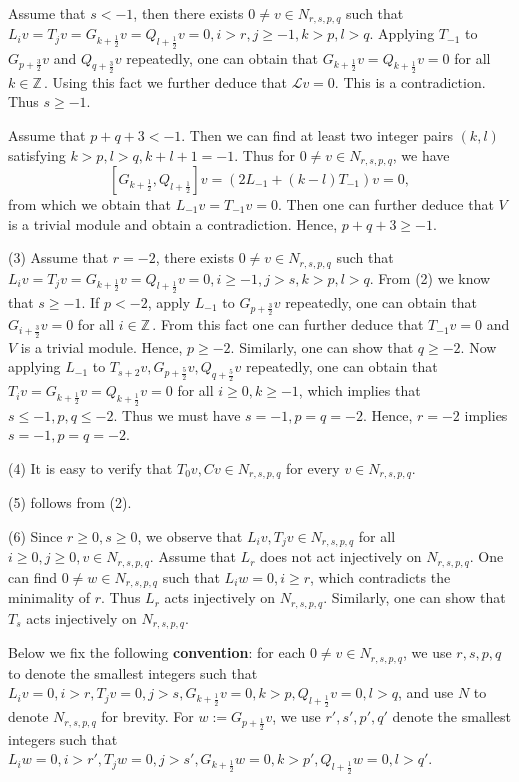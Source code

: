 \documentclass[12pt]{article}
\def\ssc{\scriptscriptstyle}
\def\Z{\mathbb{Z}{\ssc\,}}
\numberwithin{equation}{section}
\begin{document}
Assume that $s<-1$, then there exists $0\ne v\in N_{r,s,p,q}$ such that $L_iv=T_jv=G_{k+\frac{1}{2}}v=Q_{l+\frac{1}{2}}v=0, i>r,j\ge -1,k>p,l>q$. Applying $T_{-1}$ to $G_{p+\frac{3}{2}}v$ and $Q_{q+\frac{3}{2}}v$ repeatedly,
one can obtain that $G_{k+\frac{1}{2}}v=Q_{k+\frac{1}{2}}v=0$ for all $k\in\Z$. Using this fact we  further deduce  that $\mathcal{L}v=0$. This is a contradiction. Thus $s\ge -1$.

Assume that $p+q+3<-1$.  Then we can find at least two integer pairs $(k,l)$  satisfying $k>p,l>q, k+l+1=-1$. Thus for $0\ne v\in N_{r,s,p,q}$, we have
$$[G_{k+\frac{1}{2}},Q_{l+\frac{1}{2}}]v=(2L_{-1}+(k-l)T_{-1})v=0,$$
from which we obtain that
$L_{-1}v=T_{-1}v=0.$ Then one can further deduce that $V$ is a trivial module and obtain a contradiction. Hence, $p+q+3\ge -1.$

(3) Assume that $r=-2$, there exists $0\ne v\in N_{r,s,p,q}$ such that $L_iv=T_jv=G_{k+\frac{1}{2}}v=Q_{l+\frac{1}{2}}v=0, i\ge -1,j>s,k>p,l>q$. From (2) we know that $s\ge -1$. If $p<-2$, apply $L_{-1}$ to $G_{p+\frac{3}{2}}v$ repeatedly, one can obtain that $G_{i+\frac{3}{2}}v=0$ for all $i\in\Z$. From this fact one can further deduce that $T_{-1}v=0$ and $V$ is a trivial module. Hence, $p\ge -2$. Similarly, one can show that $q\ge -2$. Now applying $L_{-1}$ to $T_{s+2}v,G_{p+\frac{5}{2}}v,Q_{q+\frac{5}{2}}v$ repeatedly,
one can obtain that $T_iv=G_{k+\frac{1}{2}}v=Q_{k+\frac{1}{2}}v=0$ for all $i\ge 0, k\ge -1$, which implies that $s\le -1,p,q\le -2$. Thus we must have $s=-1,p=q=-2$. Hence,  $r=-2$ implies  $s=-1,p=q=-2$.

(4) It is easy to verify that $T_0 v, C v\in N_{r,s,p,q}$ for every $v\in N_{r,s,p,q}$.

(5) follows from (2).

 (6) Since $r\ge 0, s\ge 0$, we observe that $L_iv, T_jv\in N_{r,s,p,q}$ for all $i\ge 0,j\ge 0, v\in N_{r,s,p,q}.$ Assume that $L_r$ does not act injectively on $N_{r,s,p,q}$. One can find $0\ne w\in N_{r,s,p,q}$ such that $L_iw=0, i\ge r$, which contradicts the minimality of $r$. Thus $L_r$ acts injectively  on $N_{r,s,p,q}$. Similarly, one can show that
$T_s$ acts injectively  on $N_{r,s,p,q}$.




Below  we fix the  following {\bf convention}: for  each $0\ne v\in N_{r,s,p,q}$,  we use $r,s,p,q$ to denote the  smallest integers such that $L_iv=0,i>r,T_jv=0,j>s,G_{k+\frac{1}{2}}v=0, k>p,Q_{l+\frac{1}{2}}v=0,l>q$, and  use $N$ to denote $N_{r,s,p,q}$ for brevity.  For $w:=G_{p+\frac{1}{2}}v$,
 we use $r',s',p',q'$ denote the  smallest integers such that $L_iw=0,i>r',T_jw=0,j>s',G_{k+\frac{1}{2}}w=0, k>p', Q_{l+\frac{1}{2}}w=0,l>q'$.
\end{document}
